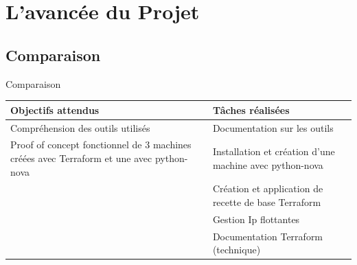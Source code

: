 \documentclass[11pt]{beamer} %
\begin{document}
	\section{L'avancée du Projet}
	
	\subsection{Comparaison}
		
		\begin{frame}{Comparaison}

		\begin{table}[]
\centering
\label{my-label}
\begin{tabular}{|p{4.5cm}|p{4.5cm}|}
\hline
\textbf{Objectifs attendus}                                                               & \textbf{Tâches réalisées}                               \\ \hline
Compréhension des outils utilisés                                                        & Documentation sur les outils                            \\ \hline
Proof of concept fonctionnel de 3 machines créées avec Terraform et une avec python-nova & Installation et création d'une machine avec python-nova \\ \hline
                                                                                         & Création et application de recette de base Terraform    \\ \hline
                                                                                         & Gestion Ip flottantes                                   \\ \hline
                                                                                         & Documentation Terraform (technique)                     \\ \hline
\end{tabular}
\end{table}

%
		\end{frame}
			
\end{document}
